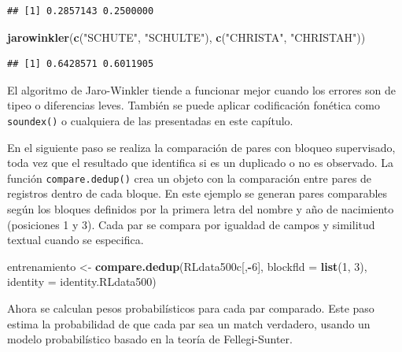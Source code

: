 \documentclass[
  12pt,
]{book}
\newenvironment{Shaded}{\begin{snugshade}}{\end{snugshade}}
\newcommand{\AttributeTok}[1]{\textcolor[rgb]{0.13,0.29,0.53}{#1}}
\newcommand{\DecValTok}[1]{\textcolor[rgb]{0.00,0.00,0.81}{#1}}
\newcommand{\FunctionTok}[1]{\textcolor[rgb]{0.13,0.29,0.53}{\textbf{#1}}}
\newcommand{\NormalTok}[1]{#1}
\newcommand{\OtherTok}[1]{\textcolor[rgb]{0.56,0.35,0.01}{#1}}
\newcommand{\SpecialCharTok}[1]{\textcolor[rgb]{0.81,0.36,0.00}{\textbf{#1}}}
\newcommand{\StringTok}[1]{\textcolor[rgb]{0.31,0.60,0.02}{#1}}
\begin{document}
\begin{verbatim}
## [1] 0.2857143 0.2500000
\end{verbatim}

\begin{Shaded}
\begin{Highlighting}[]
\FunctionTok{jarowinkler}\NormalTok{(}\FunctionTok{c}\NormalTok{(}\StringTok{"SCHUTE"}\NormalTok{, }\StringTok{"SCHULTE"}\NormalTok{),}
            \FunctionTok{c}\NormalTok{(}\StringTok{"CHRISTA"}\NormalTok{, }\StringTok{"CHRISTAH"}\NormalTok{))}
\end{Highlighting}
\end{Shaded}

\begin{verbatim}
## [1] 0.6428571 0.6011905
\end{verbatim}

El algoritmo de Jaro-Winkler tiende a funcionar mejor cuando los errores son de tipeo o diferencias leves. También se puede aplicar codificación fonética como \texttt{soundex()} o cualquiera de las presentadas en este capítulo.

En el siguiente paso se realiza la comparación de pares con bloqueo supervisado, toda vez que el resultado que identifica si es un duplicado o no es observado. La función \texttt{compare.dedup()} crea un objeto con la comparación entre pares de registros dentro de cada bloque. En este ejemplo se generan pares comparables según los bloques definidos por la primera letra del nombre y año de nacimiento (posiciones 1 y 3). Cada par se compara por igualdad de campos y similitud textual cuando se especifica.

\begin{Shaded}
\begin{Highlighting}[]
\NormalTok{entrenamiento }\OtherTok{\textless{}{-}} \FunctionTok{compare.dedup}\NormalTok{(RLdata500c[,}\SpecialCharTok{{-}}\DecValTok{6}\NormalTok{], }
                               \AttributeTok{blockfld =} \FunctionTok{list}\NormalTok{(}\DecValTok{1}\NormalTok{, }\DecValTok{3}\NormalTok{),  }
                               \AttributeTok{identity =}\NormalTok{ identity.RLdata500)}
\end{Highlighting}
\end{Shaded}

Ahora se calculan pesos probabilísticos para cada par comparado. Este paso estima la probabilidad de que cada par sea un match verdadero, usando un modelo probabilístico basado en la teoría de Fellegi-Sunter.
\end{document}
